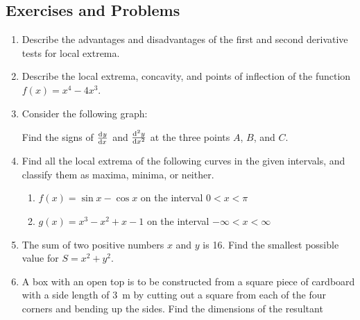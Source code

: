 \subsection{Exercises and Problems}
\begin{enumerate}
  \item Describe the advantages and disadvantages of the first and second derivative tests for local extrema.
  \item Describe the local extrema, concavity, and points of inflection of the function $ f(x) = x^4 - 4x^3 $.
  \item Consider the following graph:
        \begin{center}
        \end{center}
        Find the signs of $ \od{y}{x} $ and $ \od[2]{y}{x} $ at the three points $ A $, $ B $, and $ C $.
  \item Find all the local extrema of the following curves in the given intervals, and classify them as maxima, minima, or neither.
    \begin{enumerate}
      \item $ f(x) = \sin x - \cos x $ on the interval $ 0 < x < \pi $
      \item $ g(x) = x^3 - x^2 + x - 1 $ on the interval $ -\infty < x < \infty $
    \end{enumerate}
  \item The sum of two positive numbers $ x $ and $ y $ is 16. Find the smallest possible value for $ S = x^2 + y^2 $.
  \item A box with an open top is to be constructed from a square piece of cardboard with a side length of \SI{3}{\metre}
        by cutting out a square from each of the four corners and bending up the sides. Find the dimensions of the resultant

\end{enumerate}
